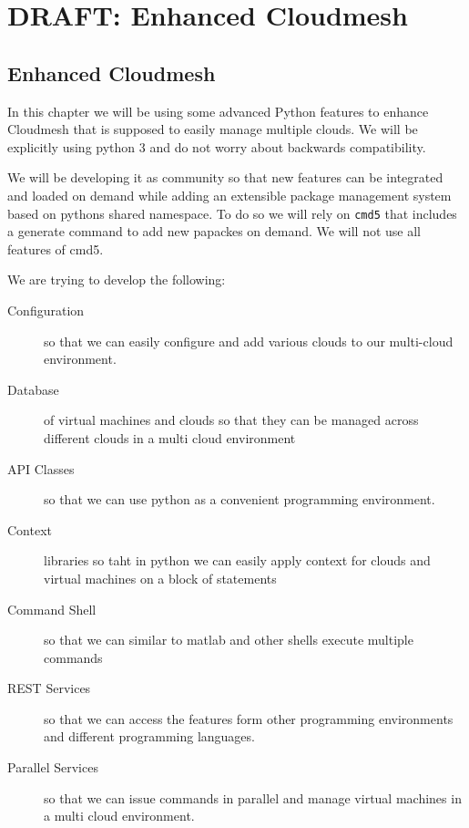 \part{DRAFT: Enhanced Cloudmesh}

\chapter{Enhanced Cloudmesh}

In this chapter we will be using some advanced Python features to
enhance Cloudmesh that is supposed to easily manage multiple
clouds. We will be explicitly using python 3 and do
not worry about backwards compatibility.

We will be developing it as community so that new features can be
integrated and loaded on demand while adding an extensible package
management system based on pythons shared namespace. To do so we will
rely on \verb|cmd5| that includes a generate command to add new
papackes on demand. We will not use all features of cmd5.

We are trying to develop the following:

\begin{description}

\item[Configuration] so that we can easily configure and add various
  clouds to our multi-cloud environment.

\item[Database] of virtual machines and clouds so that they can be
  managed across different clouds in a multi cloud environment

\item[API Classes] so that we can use python as a convenient
  programming environment.

\item[Context] libraries so taht in python we can easily apply context
  for clouds and virtual machines on a block of statements

\item[Command Shell] so that we can similar to matlab
  and other shells execute multiple commands

\item[REST Services]  so that we can access the features
form other programming environments and different programming
languages.

\item[Parallel Services] so that we can issue commands in parallel and
  manage virtual machines in a multi cloud environment.

\end{description}



